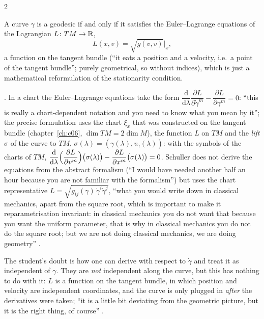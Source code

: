 \begin{paracol}{2}
\begin{theorem}\label{thm:c10-el}
A curve $\gamma$ is a geodesic if and only if it satisfies the Euler--Lagrange equations of the Lagrangian $L\colon TM\to\mathbb{R}$,
\[
  L(x,v)=\sqrt{g(v,v)}\Big|_x,
\]
a function on the tangent bundle (``it eats a position and a velocity, i.e.\ a point of the tangent bundle''; purely geometrical, so without indices), which is just a mathematical reformulation of the stationarity condition.
\end{theorem}
.
In a chart the Euler--Lagrange equations take the form $\dfrac{\mathrm d}{\mathrm d\lambda}\dfrac{\partial L}{\partial\dot\gamma^m}-\dfrac{\partial L}{\partial\gamma^m}=0$: ``this is really a chart-dependent notation and you need to know what you mean by it''; the precise formulation uses the chart $\xi_x$ that was constructed on the tangent bundle (chapter~\ref{ch:c06}, $\dim TM=2\dim M$), the function $L$ on $TM$ and the \emph{lift} $\sigma$ of the curve to $TM$, $\sigma(\lambda)=(\gamma(\lambda),v_\gamma(\lambda))$: with the symbols of the charts of $TM$, $\dfrac{\mathrm d}{\mathrm d\lambda}\Bigl(\dfrac{\partial L}{\partial v^m}\Bigr)\bigl(\sigma(\lambda)\bigr)-\dfrac{\partial L}{\partial x^m}\bigl(\sigma(\lambda)\bigr)=0$.
Schuller does not derive the equations from the abstract formalism (``I would have needed another half an hour because you are not familiar with the formalism'') but uses the chart representative $L=\sqrt{g_{ij}(\gamma)\,\dot\gamma^i\dot\gamma^j}$, ``what you would write down in classical mechanics, apart from the square root, which is important to make it reparametrisation invariant: in classical mechanics you do not want that because you want the uniform parameter, that is why in classical mechanics you do not do the square root; but we are not doing classical mechanics, we are doing geometry''
.
\begin{coursenote}
The student's doubt is how one can derive with respect to $\dot\gamma$ and treat it as independent of $\gamma$. They are \emph{not} independent along the curve, but this has nothing to do with it: $L$ is a function on the tangent bundle, in which position and velocity are independent coordinates, and the curve is only plugged in \emph{after} the derivatives were taken; ``it is a little bit deviating from the geometric picture, but it is the right thing, of course'' .
\end{coursenote}


\end{paracol}
